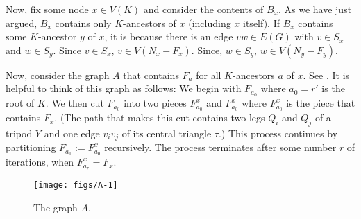 \documentclass{patmorin}
\begin{document}
Now, fix some node $x\in V(K)$ and consider the contents of $B_x$.  As we have just argued, $B_x$ contains only $K$-ancestors of $x$ (including $x$ itself). If $B_x$ contains some $K$-ancestor $y$ of $x$, it is because there is an edge $vw\in E(G)$ with $v\in S_x$ and $w\in S_y$. Since $v\in S_x$, $v\in V(N_x-F_x)$. Since, $w\in S_y$, $w\in V(N_y-F_y)$.  

Now, consider the graph $A$ that contains $F_{a}$ for all $K$-ancestors $a$ of $x$. See .  It is helpful to think of this graph as follows:  We begin with $F_{a_0}$ where $a_0=r'$ is the root of $K$.  We then cut $F_{a_0}$ into two pieces $F^{\bar{x}}_{a_0}$ and $F^x_{a_0}$ where $F^x_{a_0}$ is the piece that contains $F_x$. (The path that makes this cut contains two legs $Q_i$ and $Q_j$ of a tripod $Y$ and one edge $v_iv_j$ of its central triangle $\tau$.)  This process continues by partitioning $F_{a_1}:=F^x_{a_0}$ recursively.  The process terminates after some number $r$ of iterations, when $F^x_{a_r}=F_x$.

\begin{figure}
  \begin{center}
      \texttt{[image: figs/A-1]}
  \end{center}
  \caption{The graph $A$.}
\end{figure}
\end{document}
